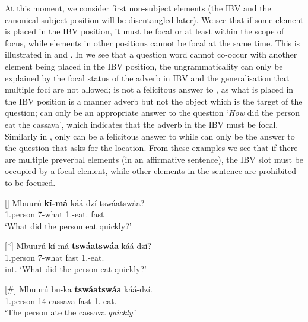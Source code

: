 \documentclass[output=paper,colorlinks,citecolor=brown,
]{langscibook}
\begin{document}
At this moment, we consider first non-subject elements (the IBV and the canonical subject position will be disentangled later). We see that if some element is placed in the IBV position, it must be focal or at least within the scope of focus, while elements in other positions cannot be focal at the same time. This is illustrated in  and . In  we see that a question word cannot co-occur with another element being placed in the IBV position, the ungrammaticality can only be explained by the focal status of the adverb in IBV and the generalisation that multiple foci are not allowed;  is not a felicitous answer to , as what is placed in the IBV position is a manner adverb but not the object which is the target of the question;  can only be an appropriate answer to the question `\textit{How} did the person eat the cassava', which indicates that the adverb in the IBV must be focal. Similarly in , only  can be a felicitous answer to  while  can only be the answer to the question that asks for the location. From these examples we see that if there are multiple preverbal elements (in an affirmative sentence), the IBV slot must be occupied by a focal element, while other elements in the sentence are prohibited to be focused.
\begin{exe} 
    \ex \label{66}
    \begin{xlist}
\ex
[]{
\label{66a}
\gll
Mbuurú \textbf{kí-má} káá-dzí tswáatswáa?\\
1.person 7-what 1\Sm{}.\Pst{}-eat.\Pst{} fast\\
\trans ‘What did the person eat quickly?’
}

\ex
[*]{
\label{66b}
\gll
Mbuurú kí-má \textbf{tswáatswáa} káá-dzí?\\
1.person 7-what fast 1\Sm{}.\Pst{}-eat.\Pst{}\\
\trans int. ‘What did the person eat quickly?’
}

\ex
[\#]{
\label{66c}
\gll
Mbuurú bu-ka \textbf{tswáatswáa} káá-dzí.\\
1.person 14-cassava fast 1\Sm{}.\Pst{}-eat.\Pst{}\\
\trans ‘The person ate the cassava \textit{quickly}.’
}

    \end{xlist}
\end{exe}
\end{document}
